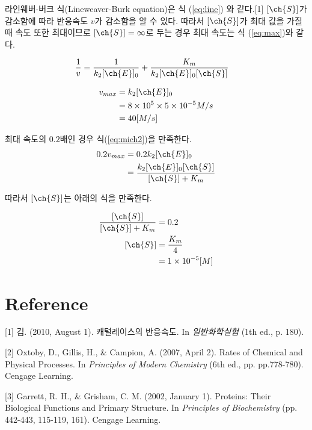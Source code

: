 \documentclass[%
 reprint,
 amsmath,amssymb,
 aps,
]{revtex4-2}
\begin{document}
라인웨버-버크 식(Lineweaver-Burk equation)은 식 (\ref{eq:line}) 와 같다.[1] $[\ch{S}]$가 감소함에 따라 반응속도 $v$가 감소함을 알 수 있다. 따라서 $[\ch{S}]$가 최대 값을 가질 때 속도 또한 최대이므로 $[\ch{S}] = \infty$로 두는 경우 최대 속도는 식 (\ref{eq:max})와 같다.

\begin{align}
	\frac{1}{v} &= \frac{1}{k_{2}[\ch{E}]_{0}} + \frac{K_{m}}{k_{2}[\ch{E}]_{0}[\ch{S}]}\label{eq:line}
\end{align}

\begin{align}
	v_{max} &= k_{2}[\ch{E}]_{0} \label{eq:max}\\
	&= 8\times 10^{5}\times 5 \times 10^{-5}M/s\\
	&= 40 [M/s]
\end{align}

최대 속도의 $0.2$배인 경우 식(\ref{eq:mich2})을 만족한다.
\begin{align}
	\begin{split}
		0.2v_{max} &= 0.2 k_{2}[\ch{E}]_{0}\\
		&=\frac{k_{2}[\ch{E}]_{0}[\ch{S}]}{[\ch{S}] + K_{m}}\label{eq:mich2}
	\end{split}
\end{align}

따라서 $[\ch{S}]$는 아래의 식을 만족한다.

\begin{align}
	\frac{[\ch{S}]}{[\ch{S}] + K_{m}} &= 0.2\\
	[\ch{S}] &= \frac{K_{m}}{4}\\
	&= 1\times 10^{-5} [M]
\end{align}


\section{\label{sec:level1}Reference}
[1] 김. (2010, August 1). 캐털레이스의 반응속도. In \textit{일반화학실험} (1th ed., p. 180).

[2] Oxtoby, D., Gillis, H., \& Campion, A. (2007, April 2). Rates of Chemical and Physical Processes. In \textit{Principles of Modern Chemistry} (6th ed., pp. pp.778-780). Cengage Learning.

[3] Garrett, R. H., \& Grisham, C. M. (2002, January 1). Proteins: Their Biological Functions and Primary Structure. In \textit{Principles of Biochemistry} (pp. 442-443, 115-119, 161). Cengage Learning.
\end{document}
